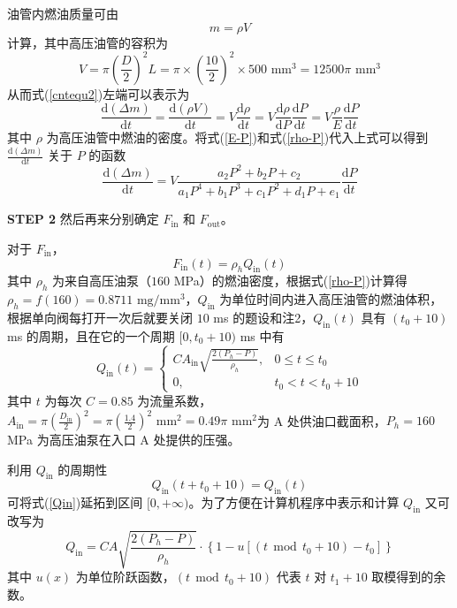 \documentclass[12pt,a4paper]{article}
\begin{document}
油管内燃油质量可由
\begin{equation}
\label{rho}
m=\rho V
\end{equation}
计算，其中高压油管的容积为
\begin{equation}
\label{volumn}
V=\pi\left(\frac{D}{2}\right)^2L=\pi\times\left(\frac{10}{2}\right)^2\times500\text{ mm}^3=12500\pi\text{ mm}^3
\end{equation}
从而式(\ref{cntequ2})左端可以表示为
\begin{equation}
\frac{\text{d}(\Delta m)}{\text{d}t}=\frac{\text{d}(\rho V)}{\text{d}t}=V\frac{\text{d}\rho}{\text{d}t}=V\frac{\text{d}\rho}{\text{d}P}\frac{\text{d}P}{\text{d}t}=V\frac{\rho}{E}\frac{\text{d}P}{\text{d}t}
\end{equation}
其中 $\rho$ 为高压油管中燃油的密度。将式(\ref{E-P})和式(\ref{rho-P})代入上式可以得到 $\frac{\text{d}(\Delta m)}{\text{d}t}$ 关于 $P$ 的函数
\begin{equation}
\label{dmdt-P}
\frac{\text{d}(\Delta m)}{\text{d}t}=V\frac{a_2P^2+b_2P+c_2}{a_1P^4+b_1P^3+c_1P^2+d_1P+e_1}\frac{\text{d}P}{\text{d}t}
\end{equation}

\textbf{\songti STEP 2} 然后再来分别确定 $F_{\text{in}}$ 和 $F_{\text{out}}$。

对于 $F_{\text{in}}$，
\begin{equation}
\label{Fin}
F_{\text{in}}(t)=\rho_hQ_{\text{in}}(t)
\end{equation}
其中 $\rho_h$ 为来自高压油泵（$160$ MPa）的燃油密度，根据式(\ref{rho-P})计算得 $\rho_h=f(160)=0.8711\text{ mg}/\text{mm}^3$，$Q_{\text{in}}$ 为单位时间内进入高压油管的燃油体积，根据单向阀每打开一次后就要关闭 $10$ ms 的题设和注2，$Q_{\text{in}}(t)$ 具有 $(t_0+10)$ ms 的周期，且在它的一个周期 $[0,t_0+10)$ ms 中有
\begin{equation}
\label{Qin}
Q_{\text{in}}(t)=\left\{\begin{array}{ll}
CA_{\text{in}}\sqrt{\frac{2(P_h-P)}{\rho_h}},&0\leq t\leq t_0\\
0,&t_0<t<t_0+10
\end{array}\right.
\end{equation}
其中 $t$ 为每次 $C=0.85$ 为流量系数，$A_{\text{in}}=\pi(\frac{D_{\text{in}}}{2})^2=\pi(\frac{1.4}{2})^2\text{ mm}^2=0.49\pi\text{ mm}^2$为 A 处供油口截面积，$P_h=160$ MPa 为高压油泵在入口 A 处提供的压强。

利用 $Q_{\text{in}}$ 的周期性
\begin{equation}
Q_{\text{in}}(t+t_0+10)=Q_{\text{in}}(t)
\end{equation}
可将式(\ref{Qin})延拓到区间 $[0,+\infty)$。为了方便在计算机程序中表示和计算 $Q_{\text{in}}$ 又可改写为
\begin{equation}
\label{Qin2}
Q_{\text{in}}=CA\sqrt{\frac{2(P_h-P)}{\rho_h}}\cdot\left\{1-u[(t~~\text{mod}~~t_0+10)-t_0]\right\}
\end{equation}
其中 $u(x)$ 为单位阶跃函数，$(t~~\text{mod}~~t_0+10)$ 代表 $t$ 对 $t_1+10$ 取模得到的余数。
\end{document}
